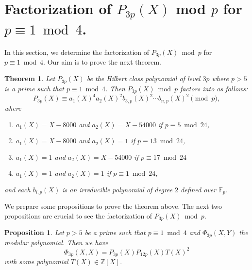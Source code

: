 \documentclass[a4paper, 11pt]{article}
\theoremstyle{plain}
\newtheorem{thm}[defn]{Theorem}
\newtheorem{prop}[defn]{Proposition}
\newcommand{\?}{\textcolor{red}{??}}
\newcommand{\fp}{\mathbb{F}_p}
\newcommand{\bZ}{\mathbb{Z}}
\begin{document}
\section{Factorization of $P_{3p}(X)$ mod $p$ for $p\equiv 1 \bmod 4$.}
\label{observationoffactorization}
In this section, we determine the factorization of $P_{3p}(X) \bmod p$ for $p\equiv1\bmod 4$. Our aim is to prove the next theorem.
\begin{thm}
\label{factorization_P3p}
    Let $P_{3p}(X)$ be the Hilbert class polynomial of level $3p$ where $p>5$ is a prime such that $p \equiv1 \bmod 4$. Then $P_{3p}(X) \bmod p$ factors into as follows:
    \[
    P_{3p}(X) \equiv a_1(X)^4a_2(X)^2b_{3,p}(X)^2\cdots b_{n,p}(X)^2 \pmod p,
    \]
    where
    \begin{enumerate}
        \item [] $a_1(X)=X-8000$ and $a_2(X)=X-54000$ if $p \equiv 5\bmod 24 $,
        \item  [] $a_1(X)=X-8000$ and $a_2(X)=1$ if $p \equiv 13\bmod 24 $,
        
          \item  [] $a_1(X)=1$ and $a_2(X)=X-54000$ if $p \equiv 17\bmod 24 $
          \item [] $a_1(X)=1$ and $a_2(X)=1$ if $p \equiv 1\bmod 24 $,
    \end{enumerate}
   and each $b_{i,p}(X)$ is an irreducible polynomial of degree $2$ defined over $\fp$.  
\end{thm}
We prepare some propositions to prove the theorem above.
The next two propositions are crucial to see the factorization of $P_{3p}(X) \bmod p$. 
\begin{prop}
\label{Modular_Hilbert}
Let $p > 5 $ be a prime such that $p \equiv1 \bmod4$ and $\Phi_{3p}(X,Y)$ the modular polynomial. Then we have
    \[
    \Phi_{3p}(X,X)=P_{3p}(X)P_{12p} (X)T(X)^2
    \]
    with some polynomial $T(X)\in \bZ[X]$.
\end{prop}
\end{document}
